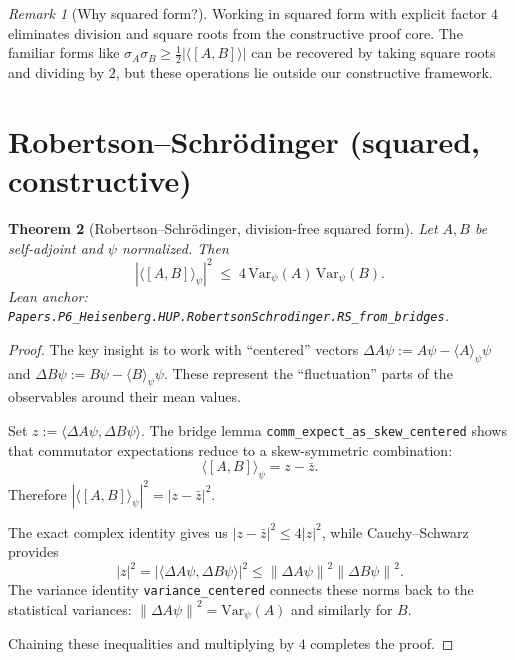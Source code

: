 \documentclass[11pt]{article}
\newcommand{\lean}[1]{\texttt{#1}}
\newcommand{\leanok}{\text{\tiny [✓ Lean Verified]}}
\newcommand{\ip}[2]{\langle #1, #2 \rangle}
\newcommand{\E}[1]{\langle #1 \rangle}
\newcommand{\comm}[2]{[#1, #2]}
\newcommand{\absC}[1]{\left| #1 \right|}
\newcommand{\abssq}[1]{\absC{#1}^{2}}
\newcommand{\norm}[1]{\left\lVert #1 \right\rVert}
\newcommand{\Var}{\mathrm{Var}}
\theoremstyle{plain}
\newtheorem{theorem}{Theorem}[section]
\theoremstyle{definition}
\theoremstyle{remark}
\newtheorem{remark}[theorem]{Remark}
\begin{document}
\begin{remark}[Why squared form?]
Working in squared form with explicit factor $4$ eliminates division and square roots from the constructive proof core. The familiar forms like $\sigma_A \sigma_B \geq \frac{1}{2}|\langle[A,B]\rangle|$ can be recovered by taking square roots and dividing by $2$, but these operations lie outside our constructive framework.
\end{remark}


\section{Robertson--Schrödinger (squared, constructive)}
\label{sec:RS}

\begin{theorem}[Robertson--Schrödinger, division-free squared form]\leanok
\label{thm:RS-squared}
Let $A,B$ be self-adjoint and $\psi$ normalized. Then
\[
  \abssq{\E{\comm{A}{B}}_\psi} \;\le\; 4\,\Var_\psi(A)\,\Var_\psi(B).
\]
\emph{Lean anchor:} \lean{Papers.P6\_Heisenberg.HUP.RobertsonSchrodinger.RS\_from\_bridges}.
\end{theorem}

\begin{proof}
The key insight is to work with ``centered'' vectors $\Delta A\psi := A\psi - \langle A \rangle_\psi \psi$ and $\Delta B\psi := B\psi - \langle B \rangle_\psi \psi$. These represent the ``fluctuation'' parts of the observables around their mean values.

Set $z := \ip{\Delta A\psi}{\Delta B\psi}$. The bridge lemma \lean{comm\_expect\_as\_skew\_centered} shows that commutator expectations reduce to a skew-symmetric combination:
\[
\E{\comm{A}{B}}_\psi = z - \bar{z}.
\]
Therefore $\abssq{\E{\comm{A}{B}}_\psi} = \abssq{z - \bar{z}}$.

The exact complex identity gives us $\abssq{z - \bar{z}} \leq 4\abssq{z}$, while Cauchy--Schwarz provides
\[
\abssq{z} = \abssq{\ip{\Delta A\psi}{\Delta B\psi}} \leq \norm{\Delta A\psi}^2 \norm{\Delta B\psi}^2.
\]
The variance identity \lean{variance\_centered} connects these norms back to the statistical variances: $\norm{\Delta A\psi}^2 = \Var_\psi(A)$ and similarly for $B$.

Chaining these inequalities and multiplying by $4$ completes the proof.
\end{proof}
\end{document}

